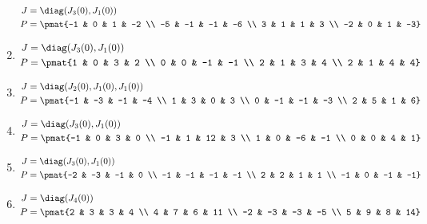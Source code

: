 \begin{enumerate}
\begin{align*}
J &= \diag(J_{3}(0), J_{1}(0))\\
P &= \pmat{-1 & 0 & 1 & -2 \\ -5 & -1 & -1 & -6 \\ 3 & 1 & 1 & 3 \\ -2 & 0 & 1 & -3}
\end{align*}

\item

\begin{align*}
J &= \diag(J_{3}(0), J_{1}(0))\\
P &= \pmat{1 & 0 & 3 & 2 \\ 0 & 0 & -1 & -1 \\ 2 & 1 & 3 & 4 \\ 2 & 1 & 4 & 4}
\end{align*}

\item

\begin{align*}
J &= \diag(J_{2}(0), J_{1}(0), J_{1}(0))\\
P &= \pmat{-1 & -3 & -1 & -4 \\ 1 & 3 & 0 & 3 \\ 0 & -1 & -1 & -3 \\ 2 & 5 & 1 & 6}
\end{align*}

\item

\begin{align*}
J &= \diag(J_{3}(0), J_{1}(0))\\
P &= \pmat{-1 & 0 & 3 & 0 \\ -1 & 1 & 12 & 3 \\ 1 & 0 & -6 & -1 \\ 0 & 0 & 4 & 1}
\end{align*}

\item

\begin{align*}
J &= \diag(J_{3}(0), J_{1}(0))\\
P &= \pmat{-2 & -3 & -1 & 0 \\ -1 & -1 & -1 & -1 \\ 2 & 2 & 1 & 1 \\ -1 & 0 & -1 & -1}
\end{align*}

\item

\begin{align*}
J &= \diag(J_{4}(0))\\
P &= \pmat{2 & 3 & 3 & 4 \\ 4 & 7 & 6 & 11 \\ -2 & -3 & -3 & -5 \\ 5 & 9 & 8 & 14}
\end{align*}


\end{enumerate}
